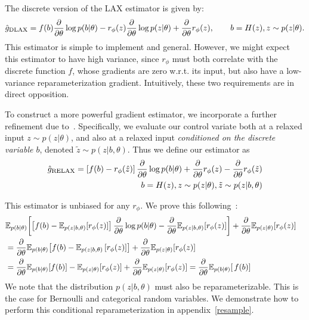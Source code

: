 \documentclass{article}
\newcommand{\discreteDist}{p(b|\theta)}
\newcommand{\loss}{f(b)}
\newcommand{\expectedLoss}{\mathbb{E}_{\discreteDist{}} \! \left[ \, \loss{} \right]}
\newcommand{\E}{\mathbb{E}}
\newcommand{\PT}{\frac{\partial}{\partial \theta}}
\newcommand{\LAX}{{\textnormal{LAX}}}
\newcommand{\DLAX}{{\textnormal{DLAX}}}
\begin{document}
The discrete version of the \LAX{} estimator is given by:
%
\begin{align}
\label{eq:discrete lax}
\hat g_\DLAX = f(b) \PT \log p(b|\theta) - r_\phi(z) \PT \log p(z|\theta) + \PT r_\phi(z), \qquad b = H(z), z \sim p(z|\theta).
\end{align}
%
This estimator is simple to implement and general.
However, we might expect this estimator to have high variance, since $r_\phi$ must both correlate with the discrete function $f$, whose gradients are zero w.r.t. its input, but also have a low-variance reparameterization gradient.
Intuitively, these two requirements are in direct opposition.

To construct a more powerful gradient estimator, we incorporate a further refinement due to~\cite{tucker2017rebar}.
Specifically, we evaluate our control variate both at a relaxed input $z \sim p(z|\theta)$, and also at a relaxed input \emph{conditioned on the discrete variable $b$}, denoted $\tilde z \sim p(z|b, \theta)$. 
Thus we define our estimator as
%
\begin{align}
\hat g_\textnormal{RELAX} = \left[ f(b) - r_\phi(\hat{z}) \right] \PT \log p(b|\theta) + \PT r_\phi(z) - \PT r_\phi (\tilde{z}) \\
\qquad b = H(z), z \sim p(z|\theta), \tilde{z} \sim p(z|b, \theta) \nonumber
\end{align}
%

This estimator is unbiased for any $r_\phi$.
We prove this following~\cite{tucker2017rebar}:
%
\begin{align}
\E_{p(b|\theta)} \! \left[\left[ f(b) - \E_{p(z|b, \theta)} \! \left[r_\phi(z) \right] \right]\PT \log p(b|\theta)  - \PT \E_{p(z|b, \theta)} \! \left[r_\phi(z) \right] \right] + \PT\E_{p(z|\theta)} \! \left[ r_\phi(z) \right] \span & \nonumber\\
&= \PT \E_{p(b|\theta)} \! \left[ f(b) - \E_{p(z|b, \theta)}\left[ r_\phi(z) \right]  \right] + \PT\E_{p(z|\theta)} \! \left[ r_\phi(z) \right]\nonumber\\
&= \PT \E_{p(b|\theta)} \! \left[ f(b) \right] - \E_{p(z|\theta)} \! \left[ r_\phi(z) \right] + \PT\E_{p(z|\theta)} \! \left[ r_\phi(z) \right]
= \PT \expectedLoss{}%
\end{align}
%
We note that the distribution $p(z|b,\theta)$ must also be reparameterizable.
This is the case for Bernoulli and categorical random variables.
We demonstrate how to perform this conditional reparameterization in appendix~\ref{resample}.
\end{document}
